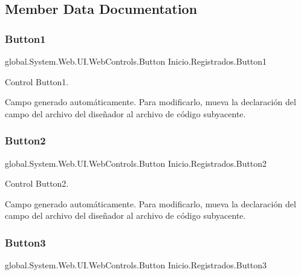\subsection{Member Data Documentation}
\mbox{\label{class_inicio_1_1_registrados_acef829ede3774fe5a9e0cf940d35e6ef}} 
\subsubsection{\texorpdfstring{Button1}{Button1}}
{\footnotesize\ttfamily global.\+System.\+Web.\+U\+I.\+Web\+Controls.\+Button Inicio.\+Registrados.\+Button1\hspace{0.3cm}{\ttfamily [protected]}}



Control Button1. 

Campo generado automáticamente. Para modificarlo, mueva la declaración del campo del archivo del diseñador al archivo de código subyacente. \mbox{\label{class_inicio_1_1_registrados_a92bb41484c2ad0de40bf04ea1ad2c868}} 
\subsubsection{\texorpdfstring{Button2}{Button2}}
{\footnotesize\ttfamily global.\+System.\+Web.\+U\+I.\+Web\+Controls.\+Button Inicio.\+Registrados.\+Button2\hspace{0.3cm}{\ttfamily [protected]}}



Control Button2. 

Campo generado automáticamente. Para modificarlo, mueva la declaración del campo del archivo del diseñador al archivo de código subyacente. \mbox{\label{class_inicio_1_1_registrados_ac3990a81617665a0ef39beeb50d83806}} 
\subsubsection{\texorpdfstring{Button3}{Button3}}
{\footnotesize\ttfamily global.\+System.\+Web.\+U\+I.\+Web\+Controls.\+Button Inicio.\+Registrados.\+Button3\hspace{0.3cm}{\ttfamily [protected]}}




